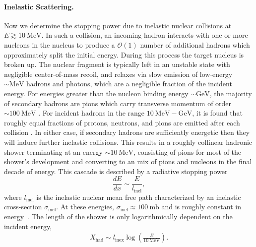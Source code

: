 \documentclass[twocolumn, preprintnumbers,amsmath,amssymb,prd, superscriptaddress]{revtex4}
\newcommand{\OO}{\mathcal{O}}
\newcommand{\GeV}{\text{GeV}}
\newcommand{\MeV}{\text{MeV}}
\def\r{\right)}
\def\l{\left(}
\begin{document}
\begin{appendices}
\paragraph{Inelastic Scattering.}
Now we determine the stopping power due to inelastic nuclear collisions at $E \gtrsim 10 ~\MeV$.
In such a collision, an incoming hadron interacts with one or more nucleons in the nucleus to produce a $\OO(1)$ number of additional hadrons which approximately split the initial energy.
During this process the target nucleus is broken up.
The nuclear fragment is typically left in an unstable state with negligible center-of-mass recoil, and relaxes via slow emission of low-energy $\sim \MeV$ hadrons and photons, which are a negligible fraction of the incident energy.
For energies greater than the nucleon binding energy $\sim \GeV$, the majority of secondary hadrons are pions which carry transverse momentum of order $\sim 100 ~\MeV$ \cite{Tavernier}.
For incident hadrons in the range $10 ~\MeV - \GeV$, it is found that roughly equal fractions of protons, neutrons, and pions are emitted after each collision \cite{Pionnuclear}.
In either case, if secondary hadrons are sufficiently energetic then they will induce further inelastic collisions.
This results in a roughly collinear hadronic shower terminating at an energy $\sim 10~\MeV$, consisting of pions for most of the shower's development and converting to an mix of pions and nucleons in the final decade of energy.
This cascade is described by a radiative stopping power
\begin{equation}
\label{eq:nucshower}
  \frac{dE}{dx} \sim \frac{E}{l_\text{inel}},
\end{equation}
where $l_\text{inel}$ is the inelastic nuclear mean free path characterized by an inelastic cross-section $\sigma_\text{inel}$.
At these energies, $\sigma_\text{inel} \approx 100 ~\text{mb}$ and is roughly constant in energy~\cite{Tavernier}.
The length of the shower is only logarithmically dependent on the incident energy,
\begin{align}
    X_\text{had} \sim l_\text{inex} \log\l\frac{E}{10~\MeV}\r.
\end{align}


\end{appendices}
\end{document}
